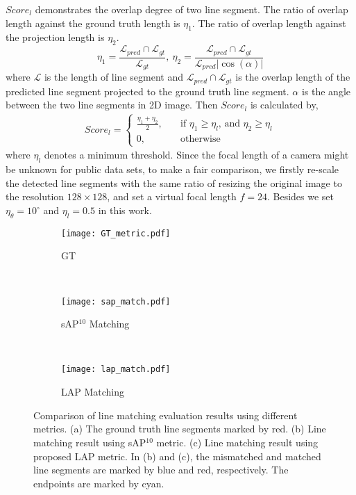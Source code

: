 \documentclass[runningheads]{llncs}
\begin{document}
$Score_l$ demonstrates the overlap degree of two line segment. The ratio of overlap length against the ground truth length is $\eta_1$. The ratio of overlap length against the projection length is $\eta_2$.
\begin{equation}
  \eta_1=\frac{\mathcal{L}_{pred} \cap \mathcal{L}_{gt}}{\mathcal{L}_{gt}}, ~
    \eta_2 = \frac{\mathcal{L}_{pred} \cap \mathcal{L}_{gt}  }{\mathcal{L}_{pred}\left|\cos(\alpha)\right|}
\end{equation}
where $\mathcal{L}$ is the length of line segment and $\mathcal{L}_{pred} \cap \mathcal{L}_{gt}$ is the overlap length of the predicted line segment projected to the ground truth line segment. $\alpha$ is the angle between the two line segments in 2D image. Then $Score_l$ is calculated by,
\begin{align}
Score_l=
\begin{cases}
\frac{\eta_1+\eta_2}{2}, &\quad \text{if }\eta_1 \geq \eta_{l}\text{, and } \eta_2 \geq \eta_{l} \\
0, &\quad \text{otherwise}
\end{cases}
\end{align}
where $\eta_{l}$ denotes a minimum threshold. Since the focal length of a camera might be unknown for public data sets, to make a fair comparison, we firstly re-scale the detected line segments with the same ratio of resizing the original image to the resolution $128\times128$, and set a virtual focal length $f=24$. Besides we set $\eta_\theta=10^{\circ}$ and $\eta_{l}=0.5$ in this work.

\begin{figure}[t]
\begin{center}
     \begin{subfigure}[b]{0.23\textwidth}
         \centering
         \texttt{[image: GT\_metric.pdf]}
         \caption{GT}
         \label{sub_fig:gt_match}
     \end{subfigure}
     ~~
     \begin{subfigure}[b]{0.23\textwidth}
         \centering
         \texttt{[image: sap\_match.pdf]}
         \caption{sAP$^{10}$ Matching}
         \label{sub_fig:sap_match}
     \end{subfigure}
    ~~
     \begin{subfigure}[b]{0.23\textwidth}
         \centering
         \texttt{[image: lap\_match.pdf]}
         \caption{LAP Matching}
         \label{sub_fig:lap_match}
     \end{subfigure}

   \end{center}
    \caption{Comparison of line matching evaluation results using different metrics. (a) The ground truth line segments marked by red. (b) Line matching result using sAP$^{10}$ metric. (c) Line matching result using proposed LAP metric. In (b) and (c), the mismatched and matched line segments are marked by blue and red, respectively. The endpoints are marked by cyan.}
    \label{metric_match}
\end{figure}
\end{document}
